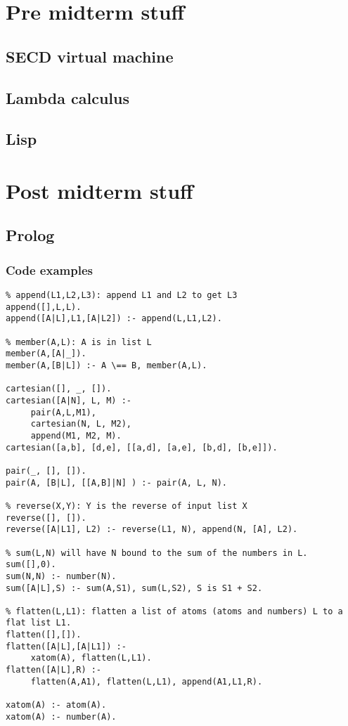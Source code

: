 \documentclass[11pt]{article}
\author{Arun Woosaree}
\date{\today}
\title{}
\begin{document}
\tableofcontents

\section{Pre midterm stuff}
\label{sec:org804909c}

\subsection{SECD virtual machine}
\label{sec:org6b91de5}

\subsection{Lambda calculus}
\label{sec:org5abf9dc}

\subsection{Lisp}
\label{sec:orge8944b3}

\section{Post midterm stuff}
\label{sec:org172eddf}
\subsection{Prolog}
\label{sec:orgf40bf68}
\subsubsection{Code examples}
\label{sec:org372e707}
\begin{verbatim}
% append(L1,L2,L3): append L1 and L2 to get L3
append([],L,L).
append([A|L],L1,[A|L2]) :- append(L,L1,L2).

% member(A,L): A is in list L
member(A,[A|_]).
member(A,[B|L]) :- A \== B, member(A,L).

cartesian([], _, []).
cartesian([A|N], L, M) :-
     pair(A,L,M1),
     cartesian(N, L, M2),
     append(M1, M2, M).
cartesian([a,b], [d,e], [[a,d], [a,e], [b,d], [b,e]]).

pair(_, [], []).
pair(A, [B|L], [[A,B]|N] ) :- pair(A, L, N).

% reverse(X,Y): Y is the reverse of input list X
reverse([], []).
reverse([A|L1], L2) :- reverse(L1, N), append(N, [A], L2).

% sum(L,N) will have N bound to the sum of the numbers in L.
sum([],0).
sum(N,N) :- number(N).
sum([A|L],S) :- sum(A,S1), sum(L,S2), S is S1 + S2.

% flatten(L,L1): flatten a list of atoms (atoms and numbers) L to a flat list L1.
flatten([],[]).
flatten([A|L],[A|L1]) :-
     xatom(A), flatten(L,L1).
flatten([A|L],R) :-
     flatten(A,A1), flatten(L,L1), append(A1,L1,R).

xatom(A) :- atom(A).
xatom(A) :- number(A).
\end{verbatim}
\end{document}
